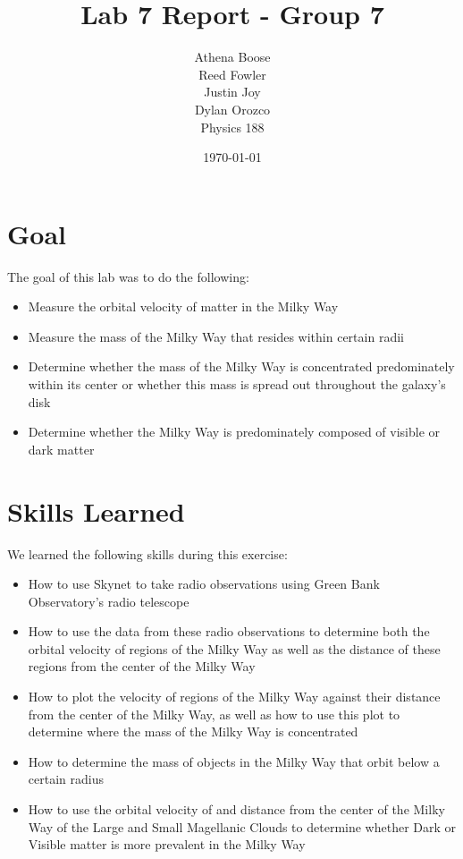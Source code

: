 \documentclass{article}
\author{Athena Boose\\Reed Fowler\\Justin Joy\\Dylan Orozco\bigskip\\Physics 188}
\date{\today}
\title{Lab 7 Report - Group 7}
\begin{document}
\cleanlookdateon
\maketitle

\section{Goal}

\noindent The goal of this lab was to do the following:

\begin{itemize}
    \item Measure the orbital velocity of matter in the Milky Way
    \item Measure the mass of the Milky Way that resides within certain radii
    \item Determine whether the mass of the Milky Way is concentrated predominately within its center or whether this mass is spread out throughout the galaxy's disk
    \item Determine whether the Milky Way is predominately composed of visible or dark matter
\end{itemize}

\section{Skills Learned}

\noindent We learned the following skills during this exercise:

\begin{itemize}
    \item How to use Skynet to take radio observations using Green Bank Observatory's radio telescope
    \item How to use the data from these radio observations to determine both the orbital velocity of regions of the Milky Way as well as the distance of these regions from the center of the Milky Way
    \item How to plot the velocity of regions of the Milky Way against their distance from the center of the Milky Way, as well as how to use this plot to determine where the mass of the Milky Way is concentrated
    \item How to determine the mass of objects in the Milky Way that orbit below a certain radius
    \item How to use the orbital velocity of and distance from the center of the Milky Way of the Large and Small Magellanic Clouds to determine whether Dark or Visible matter is more prevalent in the Milky Way
\end{itemize}
\end{document}

